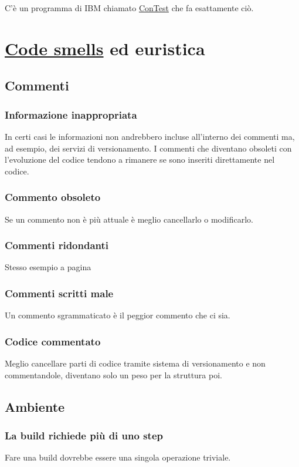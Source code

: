 \documentclass[11pt,a4paper]{book}
\begin{document}
C'è un programma di IBM chiamato \href{http://www.alphaworks.ibm.com/tech/contest}{ConTest} che fa esattamente ciò.

\chapter{\href{https://refactoring.guru/refactoring/smells}{Code smells} ed euristica}
\section{Commenti}
\subsection{Informazione inappropriata}
In certi casi le informazioni non andrebbero incluse all'interno dei commenti ma, ad esempio, dei servizi di versionamento. I commenti che diventano obsoleti con l'evoluzione del codice tendono a rimanere se sono inseriti direttamente nel codice.

\subsection{Commento obsoleto}
Se un commento non è più attuale è meglio cancellarlo o modificarlo.

\subsection{Commenti ridondanti}
Stesso esempio a pagina \pageref{code: 033}

\subsection{Commenti scritti male}
Un commento sgrammaticato è il peggior commento che ci sia.

\subsection{Codice commentato}
Meglio cancellare parti di codice tramite sistema di versionamento e non commentandole, diventano solo un peso per la struttura poi.

\section{Ambiente}
\subsection{La build richiede più di uno step}
Fare una build dovrebbe essere una singola operazione triviale.
\end{document}
